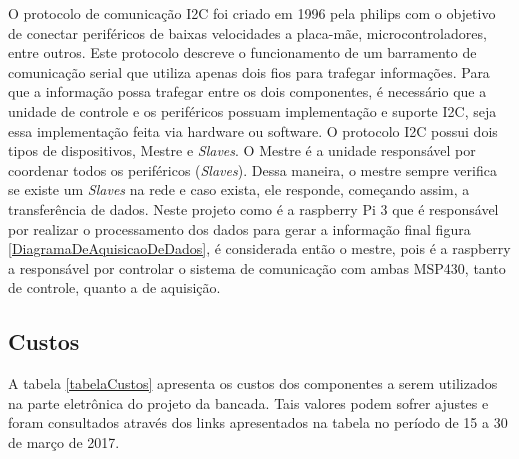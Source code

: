 O protocolo de comunicação I2C foi criado em 1996 pela philips \cite{benincasa2011desenvolvimento} com o objetivo de conectar periféricos de baixas velocidades a placa-mãe, microcontroladores, entre outros. Este protocolo descreve o funcionamento de um barramento de comunicação serial que utiliza apenas dois fios para trafegar informações. Para que a informação possa trafegar entre os dois componentes, é necessário que a unidade de controle e os periféricos possuam implementação e suporte I2C, seja essa implementação feita via hardware ou software. 
O protocolo I2C possui dois tipos de dispositivos, Mestre e \textit{Slaves}. O Mestre é a unidade responsável por coordenar todos os periféricos (\textit{Slaves}). Dessa maneira, o mestre sempre verifica se existe um \textit{Slaves} na rede e caso exista, ele responde, começando assim, a transferência de dados.
Neste projeto como é a raspberry Pi 3 que é responsável por realizar o processamento dos dados para gerar a informação final figura \ref{DiagramaDeAquisicaoDeDados}, é considerada então o mestre, pois é a raspberry a responsável por controlar o sistema de comunicação com ambas MSP430, tanto de controle, quanto a de aquisição.


\subsection{Custos}

A tabela \ref{tabelaCustos} apresenta os custos dos componentes a serem utilizados na parte eletrônica do projeto da bancada. Tais valores podem sofrer ajustes e foram consultados através dos links apresentados na tabela no período de 15 a 30 de março de 2017. 


